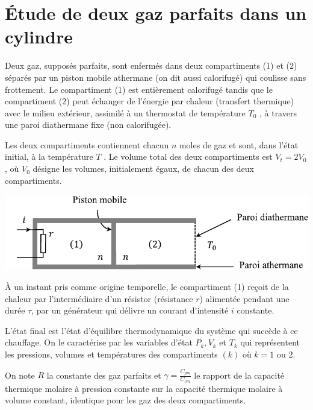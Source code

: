 \documentclass[a4paper, 12pt, garamond]{book}
\begin{document}
\newpage

\section{Étude de deux gaz parfaits dans un cylindre}

Deux gaz, supposés parfaits, sont enfermés dans deux compartiments (1)
et (2) séparés par un piston mobile athermane (on dit aussi calorifugé)
qui coulisse sans frottement. Le compartiment (1) est entièrement
calorifugé tandis que le compartiment (2) peut échanger de l'énergie par
chaleur (transfert thermique) avec le milieu extérieur, assimilé à un
thermostat de température \(T_0\) , à travers une paroi diathermane fixe
(non calorifugée).

Les deux compartiments contiennent chacun \(n\) moles de gaz et sont,
dans l'état initial, à la température \(T\) . Le volume total des deux
compartiments est \(V_t = 2V_0\) , où \(V_0\) désigne les volumes,
initialement égaux, de chacun des deux compartiments.

\begin{center}

	\includegraphics[scale=1]{figures/pb-2gaz.pdf}

\end{center}

À un instant pris comme origine temporelle, le compartiment (1) reçoit
de la chaleur par l'intermédiaire d'un résistor (résistance \(r\))
alimentée pendant une durée \(\tau\), par un générateur qui délivre un
courant d'intensité \(i\) constante.

L'état final est l'état d'équilibre thermodynamique du système qui
succède à ce chauffage. On le caractérise par les variables d'état
\(P_k , V_k\) et \(T_k\) qui représentent les pressions, volumes et
températures des compartiments \((k)\) où \(k = 1\) ou \(2\).

On note \(R\) la constante des gaz parfaits et
\(\gamma = \frac{C_{pm}}{C_{vm}}\) le rapport de la capacité thermique
molaire à pression constante sur la capacité thermique molaire à volume
constant, identique pour les gaz des deux compartiments.
\end{document}
